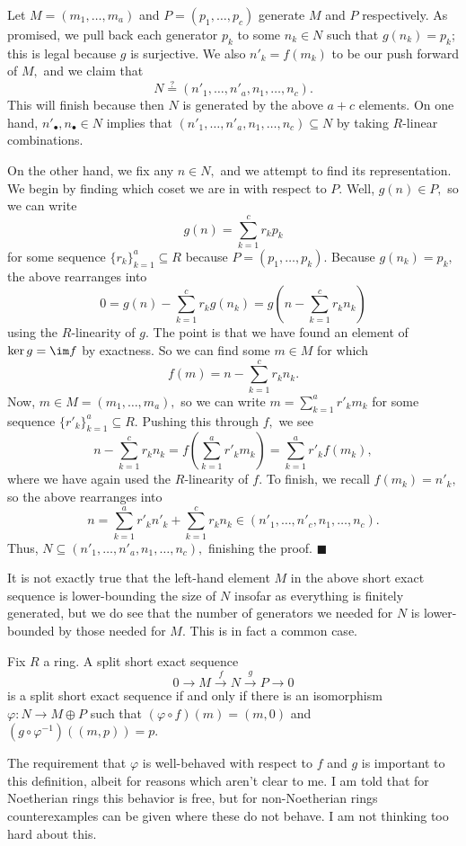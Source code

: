 Let $M=(m_1,\ldots,m_a)$ and $P=(p_1,\ldots,p_c)$ generate $M$ and $P$ respectively. As promised, we pull back each generator $p_k$ to some $n_k\in N$ such that $g(n_k)=p_k$; this is legal because $g$ is surjective. We also $n'_k=f(m_k)$ to be our push forward of $M,$ and we claim that
\[N\stackrel?=(n'_1,\ldots,n'_a,n_1,\ldots,n_c).\]
This will finish because then $N$ is generated by the above $a+c$ elements. On one hand, $n'_\bullet,n_\bullet\in N$ implies that $(n'_1,\ldots,n'_a,n_1,\ldots,n_c)\subseteq N$ by taking $R$-linear combinations.

On the other hand, we fix any $n\in N,$ and we attempt to find its representation. We begin by finding which coset we are in with respect to $P.$ Well, $g(n)\in P,$ so we can write
\[g(n)=\sum_{k=1}^cr_kp_k\]
for some sequence $\{r_k\}_{k=1}^a\subseteq R$ because $P=(p_1,\ldots,p_k).$ Because $g(n_k)=p_k,$ the above rearranges into
\[0=g(n)-\sum_{k=1}^cr_kg(n_k)=g\left(n-\sum_{k=1}^cr_kn_k\right)\]
using the $R$-linearity of $g.$ The point is that we have found an element of $\ker g=\im f$ by exactness. So we can find some $m\in M$ for which
\[f(m)=n-\sum_{k=1}^cr_kn_k.\]
Now, $m\in M=(m_1,\ldots,m_a),$ so we can write $m=\sum_{k=1}^ar'_km_k$ for some sequence $\{r'_k\}_{k=1}^a\subseteq R.$ Pushing this through $f,$ we see
\[n-\sum_{k=1}^cr_kn_k=f\left(\sum_{k=1}^ar'_km_k\right)=\sum_{k=1}^ar'_kf(m_k),\]
where we have again used the $R$-linearity of $f.$ To finish, we recall $f(m_k)=n'_k,$ so the above rearranges into
\[n=\sum_{k=1}^ar'_kn'_k+\sum_{k=1}^cr_kn_k\in(n'_1,\ldots,n'_c,n_1,\ldots,n_c).\]
Thus, $N\subseteq(n'_1,\ldots,n'_a,n_1,\ldots,n_c),$ finishing the proof. $\blacksquare$

It is not exactly true that the left-hand element $M$ in the above short exact sequence is lower-bounding the size of $N$ insofar as everything is finitely generated, but we do see that the number of generators we needed for $N$ is lower-bounded by those needed for $M.$ This is in fact a common case.
\begin{definition}
    Fix $R$ a ring. A split short exact sequence
    \[0\to M\stackrel f\to N\stackrel g\to P\to 0\]
    is a split short exact sequence if and only if there is an isomorphism $\varphi:N\to M\oplus P$ such that $(\varphi\circ f)(m)=(m,0)$ and $(g\circ\varphi^{-1})((m,p))=p.$
\end{definition}
The requirement that $\varphi$ is well-behaved with respect to $f$ and $g$ is important to this definition, albeit for reasons which aren't clear to me. I am told that for Noetherian rings this behavior is free, but for non-Noetherian rings counterexamples can be given where these do not behave. I am not thinking too hard about this.

